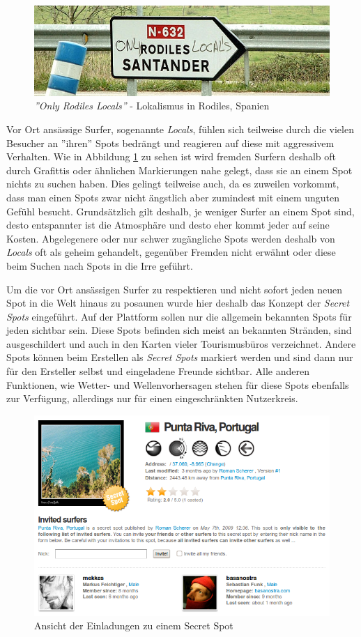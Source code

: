 \begin{figure}[h]
  \includegraphics[width=\textwidth]{bilder/locals-only}
  \caption{\textit{''Only Rodiles Locals''} - Lokalismus in Rodiles,
    Spanien}
  \label{locals-only}
\end{figure}

Vor Ort ansässige Surfer, sogenannte \textit{Locals}, fühlen sich
teilweise durch die vielen Besucher an ''ihren'' Spots bedrängt und
reagieren auf diese mit aggressivem Verhalten. Wie in Abbildung
\ref{locals-only} zu sehen ist wird fremden Surfern deshalb oft durch
Grafittis oder ähnlichen Markierungen nahe gelegt, dass sie an einem
Spot nichts zu suchen haben. Dies gelingt teilweise auch, da es
zuweilen vorkommt, dass man einen Spots zwar nicht ängstlich aber
zumindest mit einem unguten Gefühl besucht. Grundsätzlich gilt
deshalb, je weniger Surfer an einem Spot sind, desto entspannter ist
die Atmosphäre und desto eher kommt jeder auf seine
Kosten. Abgelegenere oder nur schwer zugängliche Spots werden deshalb
von \textit{Locals} oft als geheim gehandelt, gegenüber Fremden nicht
erwähnt oder diese beim Suchen nach Spots in die Irre geführt.

Um die vor Ort ansässigen Surfer zu respektieren und nicht sofort
jeden neuen Spot in die Welt hinaus zu posaunen wurde hier deshalb das
Konzept der \textit{Secret Spots} eingeführt. Auf der Plattform sollen
nur die allgemein bekannten Spots für jeden sichtbar sein. Diese Spots
befinden sich meist an bekannten Stränden, sind ausgeschildert und
auch in den Karten vieler Tourismusbüros verzeichnet. Andere Spots
können beim Erstellen als \textit{Secret Spots} markiert werden und
sind dann nur für den Ersteller selbst und eingeladene Freunde
sichtbar. Alle anderen Funktionen, wie Wetter- und Wellenvorhersagen
stehen für diese Spots ebenfalls zur Verfügung, allerdings nur für
einen eingeschränkten Nutzerkreis.

\begin{figure}[t]
 \includegraphics[width=\textwidth]{bilder/secret-spot}
 \caption{Ansicht der Einladungen zu einem Secret Spot}
 \label{secret-spot}
\end{figure}

